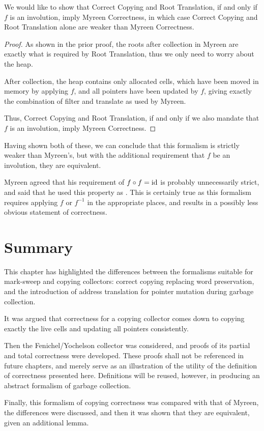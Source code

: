 \begin{theorem}
  We would like to show that Correct Copying and Root Translation, if
  and only if $f$ is an involution, imply Myreen Correctness, in which
  case Correct Copying and Root Translation alone are weaker than
  Myreen Correctness.
\end{theorem}

\begin{proof}
    As shown in the prior proof, the roots after collection in Myreen
    are exactly what is required by Root Translation, thus we only
    need to worry about the heap.

    After collection, the heap contains only allocated cells, which
    have been moved in memory by applying $f$, and all pointers have
    been updated by $f$, giving exactly the combination of filter and
    translate as used by Myreen.

    Thus, Correct Copying and Root Translation, if and only if we also
    mandate that $f$ is an involution, imply Myreen Correctness.
\end{proof}

Having shown both of these, we can conclude that this formalism is
strictly weaker than Myreen's, but with the additional requirement
that $f$ be an involution, they are equivalent.

Myreen agreed that his requirement of $f \circ f = \mathrm{id}$ is probably
unnecessarily strict, and said that he used this property as . This is certainly true as this formalism requires
applying $f$ or $f^{-1}$ in the appropriate places, and results in a
possibly less obvious statement of correctness.

\section{Summary}
\label{sec:copying-summary}

This chapter has highlighted the differences between the formalisms
suitable for mark-sweep and copying collectors: correct copying
replacing word preservation, and the introduction of address
translation for pointer mutation during garbage collection.

It was argued that correctness for a copying collector comes down to
copying exactly the live cells and updating all pointers consistently.

Then the Fenichel/Yochelson\cite{Fenichel69} collector was considered,
and proofs of its partial and total correctness were developed. These
proofs shall not be referenced in future chapters, and merely serve as
an illustration of the utility of the definition of correctness
presented here. Definitions will be reused, however, in producing an
abstract formalism of garbage collection.

Finally, this formalism of copying correctness was compared with that
of Myreen\cite{Myreen10}, the differences were discussed, and then it
was shown that they are equivalent, given an additional lemma.
